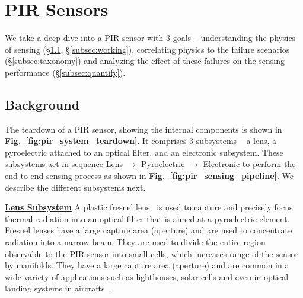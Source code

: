 \section{PIR Sensors}
\label{sec:approach}
We take a deep dive into a PIR sensor with 3 goals -- \ca understanding the physics of sensing (\S\ref{subsec:physics}, \S\ref{subsec:working}), \cb correlating physics to the failure scenarios (\S\ref{subsec:taxonomy}) and \cc analyzing the effect of these failures on the sensing performance (\S\ref{subsec:quantify}).


\subsection{Background}
\label{subsec:physics}
The teardown of a PIR sensor, showing the internal components is shown in {\bfseries Fig.~\ref{fig:pir_system_teardown}}.
%
It comprises 3 subsystems -- \ca a lens, \cb a pyroelectric attached to an optical filter, and \cc an electronic subsystem.
%
These subsystems act in sequence \ie Lens $\rightarrow$ Pyroelectric $\rightarrow$ Electronic to perform the end-to-end sensing process as shown in {\bfseries Fig.~\ref{fig:pir_sensing_pipeline}}. We describe the different subsystems next.
%

\noindent \underline{\bfseries Lens Subsystem} A plastic fresnel lens~\cite{an_murata} is used to capture and precisely focus thermal radiation into an optical filter that is aimed at a pyroelectric element. 
Fresnel lenses have a large capture area (aperture) and are used to concentrate radiation into a narrow beam. %
%
They are used to divide the entire region observable to the PIR sensor into small cells, which increases range of the sensor by manifolds. 
%
They have a large capture area (aperture) and are common in a wide variety of applications such as lighthouses, solar cells and even in optical landing systems in aircrafts~\cite{webster1999measurement}.


